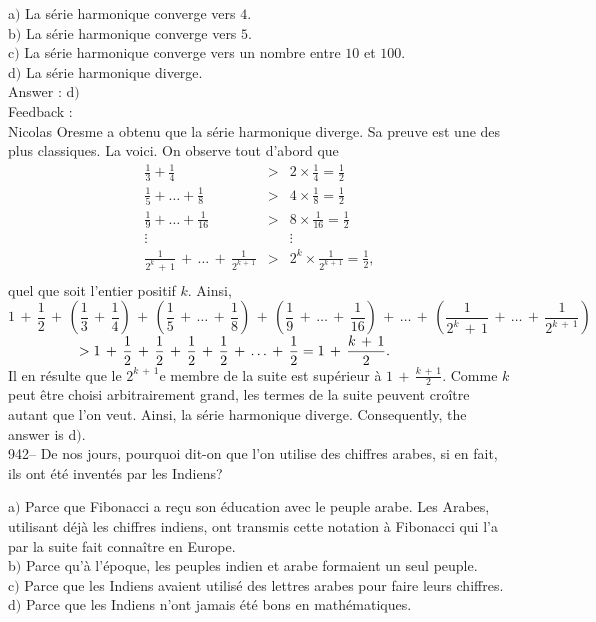 \documentclass[letterpaper, 12pt]{article}
\begin{document}
a$)$ La s\'erie harmonique converge vers $4$. \\
b$)$ La s\'erie harmonique converge vers $5$. \\
c$)$ La s\'erie harmonique converge vers un nombre entre $10$ et $100$. \\
d$)$ La s\'erie harmonique diverge.\\

Answer : d$)$\\

Feedback :\\
Nicolas Oresme a obtenu que la s\'erie harmonique diverge. Sa preuve
est une des plus classiques. La voici. On observe tout d'abord que
$$\begin{array}{rcl}
\displaystyle{\frac13+\frac14}                      & > &
\displaystyle{2\times\frac14=\frac12} \\ [3mm]
\displaystyle{\frac15+\ldots+\frac18}               & > &
\displaystyle{4\times\frac18=\frac12} \\ [3mm]
\displaystyle{\frac19+\ldots+\frac1{16}}            & > &
\displaystyle{8\times\frac1{16}=\frac12} \\ [3mm] \vdots &   &
\vdots \\ [3 mm]
\displaystyle{\frac1{2^k\,+\,1}\,+\,\ldots\,+\,\frac1{2^{k\,+\,1}}}
& > & \displaystyle{2^k\times\frac1{2^{k\,+\,1}}=\frac12}, \\ [3mm]
\end{array}$$
quel que soit l'entier positif $k$. Ainsi,
$$\displaystyle{1\,+\,\frac12\,+\,\left(\frac13\,+\,\frac14\right)\,+\,\left(\frac15\,+\,\ldots\,+\,\frac18\right)\,+\,\left(\frac19\,+\,\ldots\,+\,\frac1{16}\right)\,+\,\ldots\,+\,
\left(\frac1{2^k\,+\,1}\,+\,\ldots\,+\,\frac1{2^{k\,+\,1}}\right)}$$
$\hskip 50 pt >
\displaystyle{1\,+\,\frac12\,+\,\frac12\,+\,\frac12\,+\,\frac12\,+\,\ldots\,+\,\frac12=1\,+\,\frac{k\,+\,1}2}.$\\[3mm]
Il en r\'esulte que le $2^{k\,+\,1}$e membre de la suite est
sup\'erieur \`a $1\,+\,\frac{k\,+\,1}2$. Comme $k$ peut \^etre
choisi arbitrairement grand,
les termes de la suite peuvent cro\^itre autant que l'on veut. Ainsi, la
s\'erie harmonique diverge. Consequently, the answer is d$)$.\\

942-- De nos jours, pourquoi dit-on que l'on utilise des chiffres
arabes, si en fait, ils ont \'et\'e invent\'es par les Indiens?

a$)$ Parce que Fibonacci a re\c cu son \'education avec le peuple
arabe. Les Arabes, utilisant d\'ej\`a les chiffres indiens, ont
transmis
cette notation \`a Fibonacci qui l'a par la suite fait conna\^itre en
Europe. \\
b$)$ Parce qu'\`a l'\'epoque, les peuples indien et arabe formaient un seul
peuple.  \\
c$)$ Parce que les Indiens avaient utilis\'e des lettres arabes pour faire
leurs chiffres. \\
d$)$ Parce que les Indiens n'ont jamais \'et\'e bons en math\'ematiques.\\
\end{document}
